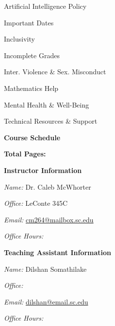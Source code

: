 \documentclass[11pt,letterpaper]{article}
\makeatletter
\newcommand{\instructor}{Dr. Caleb McWhorter}
\newcommand{\office}{LeConte 345C}
\newcommand{\phone}{}
\newcommand{\email}{cm264@mailbox.sc.edu}
\newcommand{\officehours}{}
\makeatother
\begin{document}
\begin{minipage}[t]{0.45\textwidth}
\hspace{0.3cm} Artificial Intelligence Policy \dotfill \pageref{univ_artintel} \par
\hspace{0.3cm} Important Dates \dotfill \pageref{univ_dates} \par
\hspace{0.3cm} Inclusivity \dotfill \pageref{univ_inclusion} \par
\hspace{0.3cm} Incomplete Grades \dotfill \pageref{univ_incomplete} \par
\hspace{0.3cm} Inter. Violence \& Sex. Misconduct \dotfill \pageref{univ_viosexmis} \par
\hspace{0.3cm} Mathematics Help \dotfill \pageref{univ_mathhelp} \par
\hspace{0.3cm} Mental Health \& Well-Being \dotfill \pageref{univ_mental} \par
\hspace{0.3cm} Technical Resources \& Support \dotfill \pageref{univ_techsupport} \par
{\bfseries\color{scred} Course Schedule} \dotfill \pageref{schd} \par
\hfill {\bfseries\color{scred} Total Pages:} \pageref*{LastPage}
\end{minipage}
\pspace








{\bfseries\color{scred} Instructor Information} \par
\textit{Name:} \instructor \par
\textit{Office:} \office \par
\textit{Email:} \href{mailto:\email}{\email} \par
\textit{Office Hours:} \officehours \pspace

{\bfseries\color{scred} Teaching Assistant Information} \par
\textit{Name:} Dilshan Somathilake \par
\textit{Office:}  \par
\textit{Email:} \href{mailto:dilshan@email.sc.edu}{dilshan@email.sc.edu} \par
\textit{Office Hours:}  
\pspace
\end{document}
